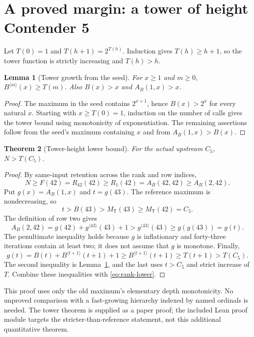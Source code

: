\documentclass[11pt]{article}
\newtheorem{theorem}{Theorem}[section]
\newtheorem{lemma}[theorem]{Lemma}
\theoremstyle{definition}
\newcommand{\T}{\mathsf T}
\newcommand{\MT}{M_{\T}}
\newcommand{\Cfive}{C_5}
\newcommand{\itf}[3]{#1^{\langle #2\rangle}(#3)}
\begin{document}
\section{A proved margin: a tower of height Contender 5}
\label{sec:tower}
Let $T(0)=1$ and $T(h+1)=2^{T(h)}$. Induction gives $T(h)\ge h+1$, so the tower
function is strictly increasing and $T(h)>h$.

\begin{lemma}[Tower growth from the seed]\label{lem:tower-seed}
For $x\ge1$ and $m\ge0$, $\itf Bmx\ge T(m)$. Also $B(x)>x$ and
$A_B(1,x)>x$.
\end{lemma}
\begin{proof}
The maximum in the seed contains $2^{x+1}$, hence $B(x)>2^x$ for every natural
$x$. Starting with $x\ge T(0)=1$, induction on the number of calls gives the
tower bound using monotonicity of exponentiation. The remaining assertions
follow from the seed's maximum containing $x$ and from
$A_B(1,x)>B(x)$.
\end{proof}

\begin{theorem}[Tower-height lower bound]\label{thm:tower}
For the actual upstream $\Cfive$, $N>T(\Cfive)$.
\end{theorem}
\begin{proof}
By same-input retention across the rank and row indices,
\begin{equation}\label{eq:rank-lower}
 N\ge F(42)=R_{42}(42)\ge R_1(42)
     =A_B(42,42)\ge A_B(2,42).
\end{equation}
Put $g(x)=A_B(1,x)$ and $t=g(43)$. The reference maximum is nondecreasing, so
\[
 t>B(43)>\MT(43)\ge\MT(42)=\Cfive.
\]
The definition of row two gives
\[
 A_B(2,42)=g(42)+\itf g{43}{43}+1
              >\itf g{43}{43}\ge g(g(43))=g(t).
\]
The penultimate inequality holds because $g$ is inflationary and forty-three
iterations contain at least two; it does not assume that $g$ is monotone.
Finally,
\[
 g(t)=B(t)+\itf B{t+1}{t+1}+1
      \ge\itf B{t+1}{t+1}\ge T(t+1)>T(\Cfive).
\]
The second inequality is Lemma~\ref{lem:tower-seed}, and the last uses $t>\Cfive$
and strict increase of $T$. Combine these inequalities with
\eqref{eq:rank-lower}.
\end{proof}
This proof uses only the old maximum's elementary depth monotonicity. No
unproved comparison with a fast-growing hierarchy indexed by named ordinals is
needed. The tower theorem is supplied as a paper proof; the included Lean proof
module targets the stricter-than-reference statement, not this additional
quantitative theorem.
\end{document}
